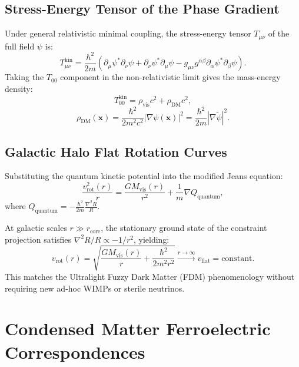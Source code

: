 \documentclass[11pt, a4paper, twocolumn]{article}
\theoremstyle{plain}
\theoremstyle{definition}
\begin{document}
\subsection{Stress-Energy Tensor of the Phase Gradient}
Under general relativistic minimal coupling, the stress-energy tensor $T_{\mu\nu}$ of the full field $\psi$ is:
\[
T_{\mu\nu}^{\mathrm{kin}} = \frac{\hbar^2}{2m} \left( \partial_\mu \psi^* \partial_\nu \psi + \partial_\nu \psi^* \partial_\mu \psi - g_{\mu\nu} g^{\alpha\beta} \partial_\alpha \psi^* \partial_\beta \psi \right).
\]
Taking the $T_{00}$ component in the non-relativistic limit gives the mass-energy density:
\[
T_{00}^{\mathrm{kin}} = \rho_{\mathrm{vis}} c^2 + \rho_{\mathrm{DM}} c^2,
\]
\[
\rho_{\mathrm{DM}}(\mathbf{x}) = \frac{\hbar^2}{2 m^2 c^2} |\nabla \psi(\mathbf{x})|^2 = \frac{\hbar^2}{2m} |\nabla \tilde{\psi}|^2 .
\]

\subsection{Galactic Halo Flat Rotation Curves}
Substituting the quantum kinetic potential into the modified Jeans equation:
\[
\frac{v_{\mathrm{rot}}^2(r)}{r} = \frac{G M_{\mathrm{vis}}(r)}{r^2} + \frac{1}{m} \nabla Q_{\mathrm{quantum}},
\]
where $Q_{\mathrm{quantum}} = -\frac{\hbar^2}{2m} \frac{\nabla^2 R}{R}$.

At galactic scales $r \gg r_{\mathrm{core}}$, the stationary ground state of the constraint projection satisfies $\nabla^2 R / R \propto -1/r^2$, yielding:
\[
v_{\mathrm{rot}}(r) = \sqrt{\frac{G M_{\mathrm{vis}}(r)}{r} + \frac{\hbar^2}{2 m^2 r^2}} \xrightarrow{r \to \infty} v_{\mathrm{flat}} = \mathrm{constant}.
\]
This matches the Ultralight Fuzzy Dark Matter (FDM) phenomenology without requiring new ad-hoc WIMPs or sterile neutrinos.

\section{Condensed Matter Ferroelectric Correspondences}
\label{sec:ferro}
\end{document}
